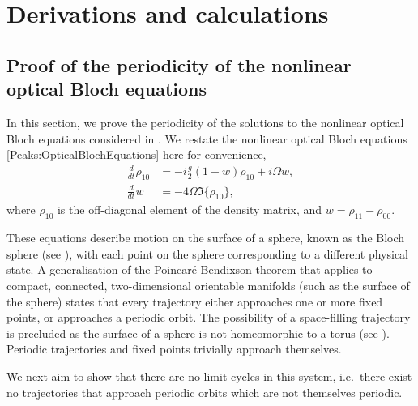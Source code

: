 \chapter{Derivations and calculations}
\label{MethodsAppendix}
\graphicspath{{Figures/MethodsAppendix/}{Figures/Common/}}


\section{Proof of the periodicity of the nonlinear optical Bloch equations}
\label{MethodsAppendix:OpticalBlochPeriodicityProof}
In this section, we prove the periodicity of the solutions to the nonlinear optical Bloch equations considered in .  We restate the nonlinear optical Bloch equations \eqref{Peaks:OpticalBlochEquations} here for convenience,
\begin{subequations}
    \label{MethodsAppendix:OpticalBlochEquations}
    \begin{align}
        \frac{d}{dt}\rho_{10} &= -i\frac{g}{2} (1-w)\rho_{10} + i \Omega w,\\
        \frac{d }{dt}w &= -4 \Omega \Im\{\rho_{10}\},
    \end{align}
\end{subequations}
where $\rho_{10}$ is the off-diagonal element of the density matrix, and $w = \rho_{11} - \rho_{00}$.

These equations describe motion on the surface of a sphere, known as the Bloch sphere (see ), with each point on the sphere corresponding to a different physical state.  A generalisation of the Poincaré-Bendixson theorem that applies to compact, connected, two-dimensional orientable manifolds \citep{Schwartz:1963} (such as the surface of the sphere) states that every trajectory either approaches one or more fixed points, or approaches a periodic orbit.  The possibility of a space-filling trajectory is precluded as the surface of a sphere is not homeomorphic to a torus (see \citep{Schwartz:1963}).  Periodic trajectories and fixed points trivially approach themselves.

We next aim to show that there are no limit cycles in this system, i.e.\ there exist no trajectories that approach periodic orbits which are not themselves periodic.

